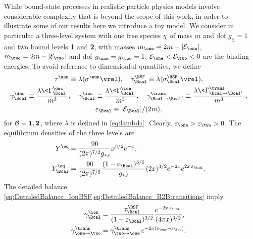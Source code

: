 \documentclass[preprint,5p,twocolumn]{elsarticle}
\begin{document}
While bound-state processes in realistic particle physics models involve considerable complexity that is beyond the scope of this work, in order to illustrate some of our results here we introduce a toy model. 
We consider in particular a three-level system with one free species $\chi$ of mass $m$ and dof $g_{\chi}=1$ and two bound levels \textbf{1} and \textbf{2}, with masses $m_{\one} = 2m-|{\cal E}_{\one}|$, $m_{\two} = 2m-|{\cal E}_{\two}|$ and dof $g_{\one}=g_{\two}=1$; ${\cal E}_{\one} < {\cal E}_{\two} < 0$ are the binding energies. To avoid reference to dimensionful quantities, we define
% 
\begin{subequations}
\begin{gather}
\tau^{\ann} \equiv \lambda (\sigma^{\ann} \vrel), \quad
\tau_{\Bcal}^{\BSF} \equiv \lambda (\sigma_{\Bcal}^{\BSF} \vrel), 
\\
\gamma_{\Bcal}^{\dec} \equiv \dfrac{\lambda \<\Gamma_{\Bcal}^{\dec}\>}{m^3}, \quad
\gamma_{\Bcal}^{\ion} \equiv \dfrac{\lambda \<\Gamma_{\Bcal}^{\ion}\>}{m^3}, \quad
\gamma_{\Bcal \to \Bcal'}^{\trans} \equiv 
\dfrac{\lambda \<\Gamma_{\Bcal \to \Bcal'}^{\trans}\>}{m^3} ,
\\
\varepsilon_{\Bcal} \equiv |{\cal E}_{\Bcal}|/(2m),
\end{gather}
\end{subequations}
%
for ${\cal B} = \mathbf{1,2}$, where $\lambda$ is defined in \cref{eq:lambda}. 
Clearly, $\varepsilon_{\one} > \varepsilon_{\two} > 0$.
The equilibrium densities of the three levels are
%
\begin{subequations}
\begin{align}
Y^{\eq} &= \dfrac{90}{(2\pi)^{7/2} g_{*\mathsmaller{S}} } x^{3/2}e^{-x}, \\ 
Y_{\Bcal}^{\eq} &= \dfrac{90}{(2\pi)^{7/2}}  
\dfrac{(1-\varepsilon_{\Bcal})^{3/2}}{g_{*\mathsmaller{S}}}
(2x)^{3/2} e^{-2x}  e^{2x \, \varepsilon_{\Bcal}} .
\end{align}
\end{subequations}
%
The detailed balance \cref{eq:DetailedBalance_IonBSF,eq:DetailedBalance_B2Btransitions} imply
%
\begin{subequations}
\begin{align}
\gamma_{\Bcal}^{\ion} &= 
\dfrac{\tau_{\Bcal}^{\BSF}}{(1-\varepsilon_{\Bcal})^{3/2}}
\dfrac{e^{-2x \, \varepsilon_{\Bcal}}}{(4\pi x)^{3/2}} , 
\\
\gamma_{\one \to \two}^{\trans} &= 
\gamma_{\two \to \one}^{\trans} \, 
e^{-2x (\varepsilon_{\one}-\varepsilon_{\two})} .
\end{align}
\end{subequations}
\end{document}
